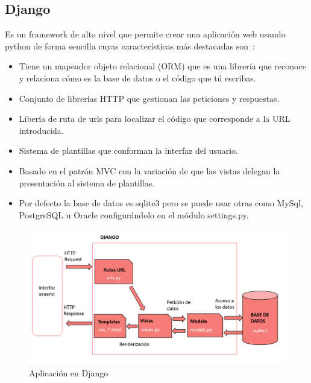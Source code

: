 \documentclass[a4paper, 12pt]{book}
\begin{document}
\subsection{Django}
Es un framework de alto nivel que permite crear una aplicación web usando python de forma sencilla cuyas características más destacadas son~\cite{bennett2009practical}:
\begin{itemize}
    \item Tiene un mapeador objeto relacional (ORM) que es una librería que reconoce y relaciona cómo es la base de datos o el código que tú escribas.
    \item Conjunto de librerías HTTP que gestionan las peticiones y respuestas.
    \item Libería de ruta de urls para localizar el código que corresponde a la URL introducida. 
    \item Sistema de plantillas que conforman la interfaz del usuario.
    \item Basado en el patrón MVC con la variación de que las vistas delegan la presentación al sistema de plantillas.
    \item Por defecto la base de datos es sqlite3 pero se puede usar otras como MySql, PostgreSQL u Oracle configurándolo en el módulo settings.py.
   
\end{itemize}

\begin{figure}[h]
        \centering
        \includegraphics[scale=0.5]{img/django.png}
        \caption{Aplicación en Django }
        \label{figura:appDjango}
\end{figure}
\end{document}
